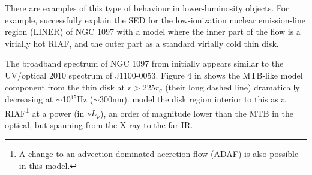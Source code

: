 \documentclass[a4paper,fleqn,usenatbib]{mnras}
\begin{document}
{There are examples of this type of behaviour in lower-luminosity
objects.  For example, \citet{Nemmen2006} successfully explain the SED
for the low-ionization nuclear emission-line region (LINER) of NGC
1097 with a model where the inner part of the flow is a virially hot
RIAF, and the outer part as a standard virially cold thin disk.

The broadband spectrum of NGC 1097 from \citet{Nemmen2006} initially
appears similar to the UV/optical 2010 spectrum of J1100-0053.  Figure
4 in \citet{Nemmen2006} shows the MTB-like model component from the
thin disk at $r>225r_{g}$ (their long dashed line) dramatically
decreasing at $\sim$10$^{15}$Hz ($\sim$300nm). \citet{Nemmen2006}
model the disk region interior to this as a RIAF\footnote{A change to
an advection-dominated accretion flow (ADAF) is also possible in this
model.} at a power (in $\nu L_{\nu}$), an order of magnitude lower
than the MTB in the optical, but spanning from the X-ray to the
far-IR.

}
\end{document}
